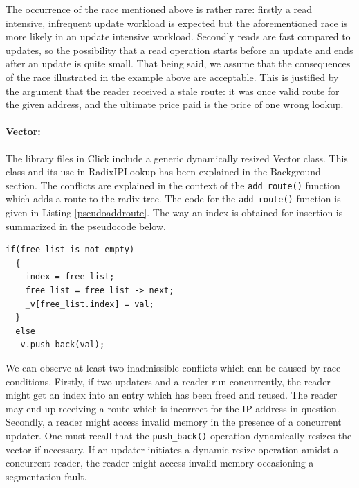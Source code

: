 \documentclass[a4paper,marginparwidth=50pt,marginparsep=10pt]{article}
\begin{document}
The occurrence of the race mentioned above is rather rare: firstly a read intensive, infrequent update workload is expected but the aforementioned race is more likely in an update intensive workload. Secondly reads are fast compared to updates, so the possibility that a read operation starts before an update and ends after an update is quite small. That being said, we assume that the consequences of the race illustrated in the example above are acceptable. This is justified by the argument that the reader received a stale route: it was once valid route for the given address, and the ultimate price paid is the price of one wrong lookup.
\paragraph{Vector:}
The library files in Click include a generic dynamically resized Vector class. This class and its use in RadixIPLookup has been explained in the Background section. The conflicts are explained in the context of the \verb+add_route()+ function which adds a route to the radix tree. The code for the \verb+add_route()+ function is given in Listing \ref{pseudoaddroute}. The way an index is obtained for insertion is summarized in the pseudocode below. 
\begin{lstlisting}[caption = Pseudocode for acquiring an index in add\_route, label=pseudoaddroute]
  if(free_list is not empty)
  {
    index = free_list;
    free_list = free_list -> next;
    _v[free_list.index] = val;
  }
  else 
  _v.push_back(val);
\end{lstlisting}
We can observe at least two inadmissible conflicts which can be caused by race conditions. Firstly, if two updaters and a reader run concurrently, the reader might get an index into an entry which has been freed and reused. The reader may end up receiving a route which is incorrect for the IP address in question. Secondly, a reader might access invalid memory in the presence of a concurrent updater. One must recall that the \verb+push_back()+ operation dynamically resizes the vector if necessary. If an updater initiates a dynamic resize operation amidst a concurrent reader, the reader might access invalid memory occasioning a segmentation fault.
\end{document}
